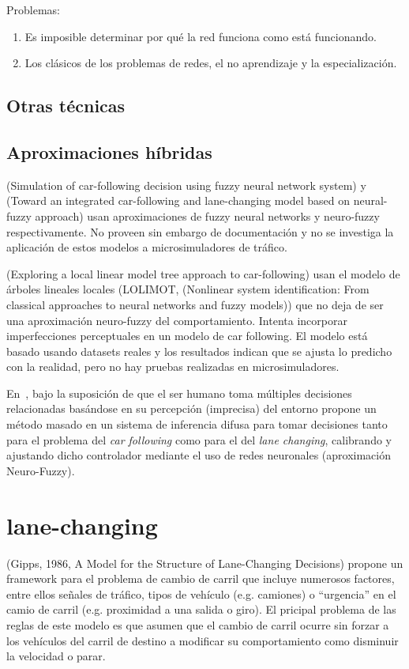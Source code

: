 Problemas:

\begin{enumerate}
	\item Es imposible determinar por qué la red funciona como está funcionando.
	\item Los clásicos de los problemas de redes, el no aprendizaje y la especialización.
\end{enumerate}

\subsection{Otras técnicas}

\subsection{Aproximaciones híbridas}

(Simulation of car-following decision using fuzzy neural network system) y (Toward an integrated car-following and lane-changing model based on neural-fuzzy approach) usan aproximaciones de fuzzy neural networks y neuro-fuzzy respectivamente. No proveen sin embargo de documentación y no se investiga la aplicación de estos modelos a microsimuladores de tráfico.

(Exploring a local linear model tree approach to car-following) usan el modelo de árboles lineales locales (LOLIMOT, (Nonlinear system identification: From classical approaches to neural networks and fuzzy models)) que no deja de ser una aproximación neuro-fuzzy del comportamiento. Intenta incorporar imperfecciones perceptuales en un modelo de car following. El modelo está basado usando datasets reales y los resultados indican que se ajusta lo predicho con la realidad, pero no hay pruebas realizadas en microsimuladores.

En~\cite{Ma2004}, bajo la suposición de que el ser humano toma múltiples decisiones relacionadas basándose en su percepción (imprecisa) del entorno propone un método masado en un sistema de inferencia difusa para tomar decisiones tanto para el problema del \textit{car following} como para el del \textit{lane changing}, calibrando y ajustando dicho controlador mediante el uso de redes neuronales (aproximación Neuro-Fuzzy).

\section{lane-changing}

(Gipps, 1986, A Model for the Structure of Lane-Changing Decisions) propone un framework para el problema de cambio de carril que incluye numerosos factores, entre ellos señales de tráfico, tipos de vehículo (e.g. camiones) o \enquote{urgencia} en el camio de carril (e.g. proximidad a una salida o giro). El pricipal problema de las reglas de este modelo es que asumen que el cambio de carril ocurre sin forzar a los vehículos del carril de destino a modificar su comportamiento como disminuir la velocidad o parar.

